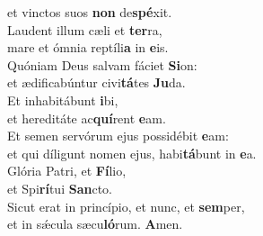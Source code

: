 \evenverse et vinctos suos \textbf{non} de\textbf{spé}xit.\\
\oddverse Laudent illum cæli et \textbf{ter}ra,~\*\\
\oddverse mare et ómnia reptíli\textbf{a} in \textbf{e}is.\\
\evenverse Quóniam Deus salvam fáciet \textbf{Si}on:~\*\\
\evenverse et ædificabúntur civi\textbf{tá}tes \textbf{Ju}da.\\
\oddverse Et inhabitábunt \textbf{i}bi,~\*\\
\oddverse et hereditáte ac\textbf{quí}rent \textbf{e}am.\\
\evenverse Et semen servórum ejus possidébit \textbf{e}am:~\*\\
\evenverse et qui díligunt nomen ejus, habi\textbf{tá}bunt in \textbf{e}a.\\
\oddverse Glória Patri, et \textbf{Fí}lio,~\*\\
\oddverse et Spi\textbf{rí}tui \textbf{San}cto.\\
\evenverse Sicut erat in princípio, et nunc, et \textbf{sem}per,~\*\\
\evenverse et in sǽcula sæcu\textbf{ló}rum. \textbf{A}men.\\
